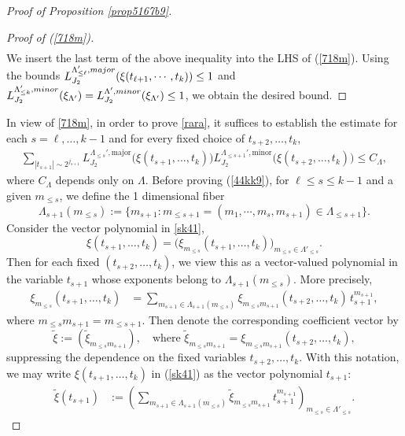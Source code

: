 \documentclass[10pt,a4paper]{amsart}
\numberwithin{equation}{section}
\begin{document}
\begin{proof}[Proof of Proposition \ref{prop5167b9}]
\begin{proof}[Proof of (\ref{718m})]
\begin{align*}
\end{align*} 
We insert the last term of the above inequality into the  LHS of (\ref{718m}). Using  the bounds $ L^{\Lambda_{\le \ell}',\rm{major}}_{J_2}(\xi(t_{\ell+1},\cdots,t_k) )\le 1$ and  $L^{\Lambda_{\le k}',\rm{minor}}_{J_2}(\xi_{\Lambda'})=L^{\Lambda',\rm{minor}}_{J_2}(\xi_{\Lambda'})\le 1$, we obtain the desired bound.
\end{proof}
In view of \eqref{718m}, in order to prove \eqref{rara}, it suffices to establish the estimate for each $s=\ell,\dots,k-1$ and for every fixed choice of $t_{s+2},\dots,t_k$,
\begin{align}\label{44kk9}
\sum_{|t_{s+1}|\sim 2^{j_{s+1}}}
L^{\Lambda_{\le s}',\mathrm{major}}_{J_2}\bigl(\xi(t_{s+1},\dots,t_k)\bigr)
L^{\Lambda_{\le s+1}',\mathrm{minor}}_{J_2}\bigl(\xi(t_{s+2},\dots,t_k)\bigr)
\le C_{\Lambda},
\end{align}
  where $C_{\Lambda}$ depends only on $\Lambda$. 
 Before proving (\ref{44kk9}), for $\ell \le s\le k-1$ and
a given $m_{\le s}$, 
we  define the 1 dimensional fiber $$\Lambda_{s+1}(m_{\le s}):=\{m_{s+1}: m_{\le s+1}=(m_1,\cdots,m_s,m_{s+1})\in \Lambda_{\le s+1}\}.$$
Consider the vector polynomial  in \eqref{sk41},
\[
\xi(t_{s+1},\dots,t_k)
= \bigl(\xi_{m_{\le s}}(t_{s+1},\dots,t_k)\bigr)_{m_{\le s}\in \Lambda'_{\le s}}.
\]
Then for each fixed $(t_{s+2},\dots,t_k)$, we view this as a vector-valued polynomial in the variable $t_{s+1}$ whose exponents belong to $\Lambda_{s+1}(m_{\le s})$. More precisely,
\begin{align*}
\xi_{m_{\le s}}(t_{s+1},\dots,t_k)
&= \sum_{m_{s+1}\in \Lambda_{s+1}(m_{\le s})}
\xi_{m_{\le s}m_{s+1}}(t_{s+2},\dots,t_k)\, t_{s+1}^{m_{s+1}},
\end{align*}
where $m_{\le s}m_{s+1} = m_{\le s+1}$.
Then    denote the corresponding coefficient vector by
\[
\tilde{\xi} := (\tilde{\xi}_{m_{\le s}m_{s+1}}),
\quad \text{where } \tilde{\xi}_{m_{\le s}m_{s+1}}
= \xi_{m_{\le s}m_{s+1}}(t_{s+2},\dots,t_k),
\]
suppressing the dependence on the fixed variables $t_{s+2},\dots,t_k$. With this notation, we may write $
\xi(t_{s+1},\dots,t_k)$ in (\ref{sk41}) as the  vector polynomial $t_{s+1}$:
\begin{align*}
\tilde{\xi}(t_{s+1})
&:= \left(
\sum_{m_{s+1}\in \Lambda_{s+1}(m_{\le s})}
\tilde{\xi}_{m_{\le s}m_{s+1}}\, t_{s+1}^{m_{s+1}}
\right)_{m_{\le s}\in \Lambda'_{\le s}}.
\end{align*}
 

\end{proof}
\end{document}
